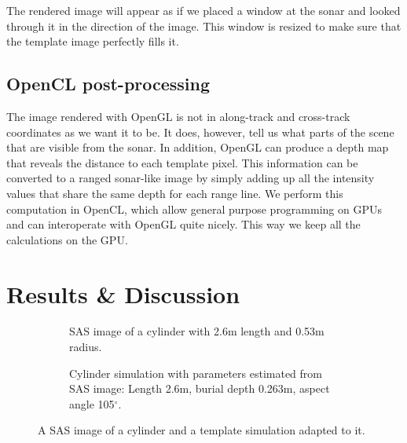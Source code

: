 \documentclass[
   UAM                                          %
 , 12pt                                         %
 , bibtex                                       %
 , layout
]{common/mytemplate}
\begin{document}
The rendered image will appear as if we placed a window at the sonar and looked through it in the direction of the image. This window is resized to make sure that the template image perfectly fills it.

\subsection{OpenCL post-processing}

The image rendered with OpenGL is not in along-track and cross-track coordinates as we want it to be. It does, however, tell us what parts of the scene that are visible from the sonar. In addition, OpenGL can produce a depth map that reveals the distance to each template pixel. This information can be converted to a ranged sonar-like image by simply adding up all the intensity values that share the same depth for each range line. We perform this computation in OpenCL, which allow general purpose programming on GPUs and can interoperate with OpenGL quite nicely. This way we keep all the calculations on the GPU.



\section{Results \& Discussion}

\newlength\imgspacing\setlength\imgspacing{.5cm}
\setcounter{topnumber}{2}

\begin{figure}[p]\centering%
\begin{subfigure}[t]{.5\linewidth-\imgspacing/2}
%
\caption{SAS image of a cylinder with 2.6\;m length and 0.53\;m radius.}\label{data_cylinder}%
\end{subfigure}
\begin{subfigure}[t]{.5\linewidth-\imgspacing/2}
%
\caption{Cylinder simulation with parameters estimated from SAS image: Length 2.6\;m, burial depth 0.263\;m, aspect angle 105$^\circ$.}\label{sim_cylinder}%
\end{subfigure}
\caption{A SAS image of a cylinder and a template simulation adapted to it.}
\end{figure}
\end{document}
